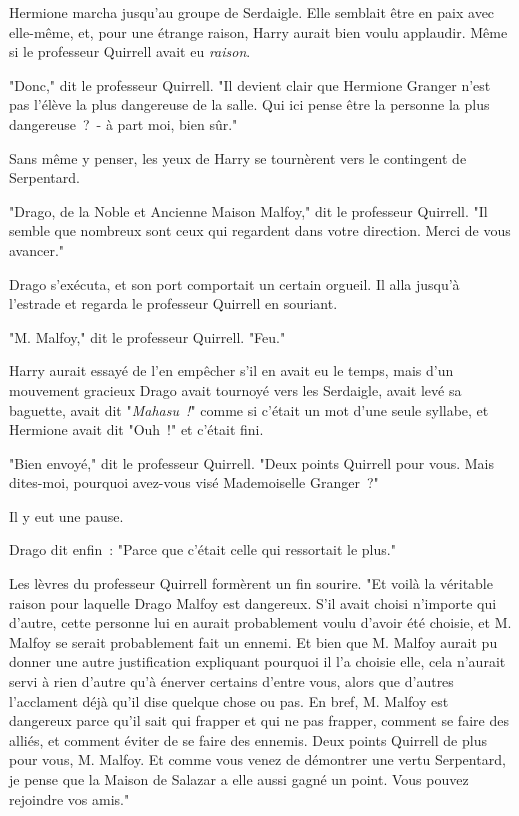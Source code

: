 Hermione marcha jusqu'au groupe de Serdaigle. Elle semblait être en paix avec elle-même, et, pour une étrange raison, Harry aurait bien voulu applaudir. Même si le professeur Quirrell avait eu \emph{raison}.

"Donc," dit le professeur Quirrell. "Il devient clair que Hermione Granger n'est pas l'élève la plus dangereuse de la salle. Qui ici pense être la personne la plus dangereuse~?~- à part moi, bien sûr."

Sans même y penser, les yeux de Harry se tournèrent vers le contingent de Serpentard.

"Drago, de la Noble et Ancienne Maison Malfoy," dit le professeur Quirrell. "Il semble que nombreux sont ceux qui regardent dans votre direction. Merci de vous avancer."

Drago s'exécuta, et son port comportait un certain orgueil. Il alla jusqu'à l'estrade et regarda le professeur Quirrell en souriant.

"M. Malfoy," dit le professeur Quirrell. "Feu."

Harry aurait essayé de l'en empêcher s'il en avait eu le temps, mais d'un mouvement gracieux Drago avait tournoyé vers les Serdaigle, avait levé sa baguette, avait dit "\emph{Mahasu~!}" comme si c'était un mot d'une seule syllabe, et Hermione avait dit "Ouh~!" et c'était fini.

"Bien envoyé," dit le professeur Quirrell. "Deux points Quirrell pour vous. Mais dites-moi, pourquoi avez-vous visé Mademoiselle Granger~?"

Il y eut une pause.

Drago dit enfin~: "Parce que c'était celle qui ressortait le plus."

Les lèvres du professeur Quirrell formèrent un fin sourire. "Et voilà la véritable raison pour laquelle Drago Malfoy est dangereux. S'il avait choisi n'importe qui d'autre, cette personne lui en aurait probablement voulu d'avoir été choisie, et M. Malfoy se serait probablement fait un ennemi. Et bien que M. Malfoy aurait pu donner une autre justification expliquant pourquoi il l'a choisie elle, cela n'aurait servi à rien d'autre qu'à énerver certains d'entre vous, alors que d'autres l'acclament déjà qu'il dise quelque chose ou pas. En bref, M. Malfoy est dangereux parce qu'il sait qui frapper et qui ne pas frapper, comment se faire des alliés, et comment éviter de se faire des ennemis. Deux points Quirrell de plus pour vous, M. Malfoy. Et comme vous venez de démontrer une vertu Serpentard, je pense que la Maison de Salazar a elle aussi gagné un point. Vous pouvez rejoindre vos amis."


